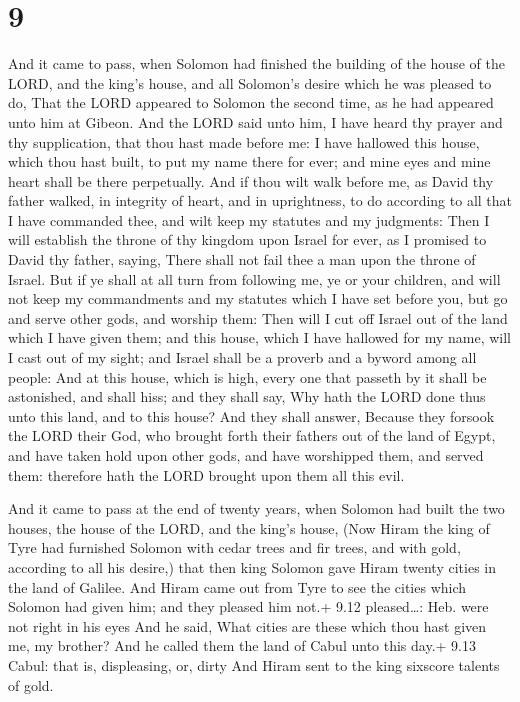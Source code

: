 \hypertarget{section-8}{%
\section{9}\label{section-8}}

 And it came to pass, when Solomon had finished the building
of the house of the LORD, and the king's house, and all Solomon's desire
which he was pleased to do,  That the LORD appeared to
Solomon the second time, as he had appeared unto him at Gibeon.
 And the LORD said unto him, I have heard thy prayer and thy
supplication, that thou hast made before me: I have hallowed this house,
which thou hast built, to put my name there for ever; and mine eyes and
mine heart shall be there perpetually.  And if thou wilt
walk before me, as David thy father walked, in integrity of heart, and
in uprightness, to do according to all that I have commanded thee, and
wilt keep my statutes and my judgments:  Then I will
establish the throne of thy kingdom upon Israel for ever, as I promised
to David thy father, saying, There shall not fail thee a man upon the
throne of Israel.  But if ye shall at all turn from
following me, ye or your children, and will not keep my commandments and
my statutes which I have set before you, but go and serve other gods,
and worship them:  Then will I cut off Israel out of the
land which I have given them; and this house, which I have hallowed for
my name, will I cast out of my sight; and Israel shall be a proverb and
a byword among all people:  And at this house, which is
high, every one that passeth by it shall be astonished, and shall hiss;
and they shall say, Why hath the LORD done thus unto this land, and to
this house?  And they shall answer, Because they forsook the
LORD their God, who brought forth their fathers out of the land of
Egypt, and have taken hold upon other gods, and have worshipped them,
and served them: therefore hath the LORD brought upon them all this
evil.

 And it came to pass at the end of twenty years, when
Solomon had built the two houses, the house of the LORD, and the king's
house,  (Now Hiram the king of Tyre had furnished Solomon
with cedar trees and fir trees, and with gold, according to all his
desire,) that then king Solomon gave Hiram twenty cities in the land of
Galilee.  And Hiram came out from Tyre to see the cities
which Solomon had given him; and they pleased him not.+ 9.12
pleased\ldots: Heb. were not right in his eyes  And he
said, What cities are these which thou hast given me, my brother? And he
called them the land of Cabul unto this day.+ 9.13 Cabul: that is,
displeasing, or, dirty  And Hiram sent to the king sixscore
talents of gold.

